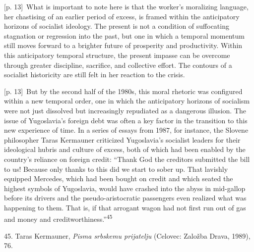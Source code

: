 \documentclass[10pt,a4paper]{article}
\begin{document}
{\scriptsize\color{gray} [p. 13]}\ What is important to note here is that the worker’s moralizing language, her chastising of an earlier period of excess, is framed within the anticipatory horizons of socialist ideology. The present is not a condition of suffocating stagnation or regression into the past, but one in which a temporal momentum still moves forward to a brighter future of prosperity and productivity. Within this anticipatory temporal structure, the present impasse can be overcome through greater discipline, sacrifice, and collective effort. The contours of a socialist historicity are still felt in her reaction to the crisis.\par
{\scriptsize\color{gray} [p. 13]}\ But by the second half of the 1980s, this moral rhetoric was configured within a new temporal order, one in which the anticipatory horizons of socialism were not just dissolved but increasingly repudiated as a dangerous illusion. The issue of Yugoslavia’s foreign debt was often a key factor in the transition to this new experience of time. In a series of essays from 1987, for instance, the Slovene philosopher Taras Kermauner criticized Yugoslavia’s socialist leaders for their ideological hubris and culture of excess, both of which had been enabled by the country’s reliance on foreign credit: “Thank God the creditors submitted the bill to us! Because only thanks to this did we start to sober up. That lavishly equipped Mercedes, which had been bought on credit and which seated the highest symbols of Yugoslavia, would have crashed into the abyss in mid-gallop before its drivers and the pseudo-aristocratic passengers even realized what was happening to them. That is, if that arrogant wagon had not first run out of gas and money and creditworthiness.”\nobreak\textsuperscript{45}\par{\small 45. Taras Kermauner, \textit{Pisma srbskemu prijatelju} (Celovec: Založba Drava, 1989), 76.\par}
\end{document}
